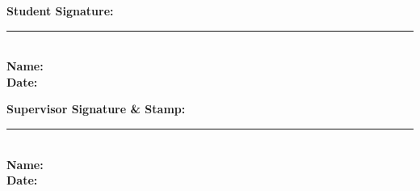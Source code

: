 \documentclass[11pt,a4paper]{article}
\begin{document}
\vspace{2.5em}

\noindent
\begin{minipage}[t]{0.46\textwidth}
    \textbf{Student Signature:}\\[3.5em]
    \rule{\linewidth}{0.6pt}\\[0.4em]
    \textbf{Name:}\\[0.3em]
    \textbf{Date:}
\end{minipage}%
\hfill
\begin{minipage}[t]{0.46\textwidth}
    \textbf{Supervisor Signature \& Stamp:}\\[3.5em]
    \rule{\linewidth}{0.6pt}\\[0.4em]
    \textbf{Name:}\\[0.3em]
    \textbf{Date:}
\end{minipage}
\end{document}
